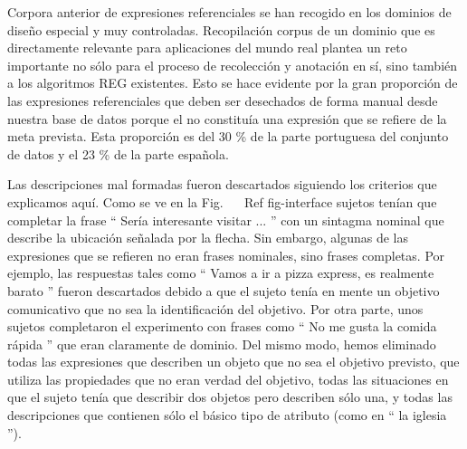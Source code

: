 Corpora anterior de expresiones referenciales se han recogido en los dominios de dise\~no especial y muy controladas. Recopilaci\'on corpus de un dominio que es directamente relevante para aplicaciones del mundo real plantea un reto importante no s\'olo para el proceso de recolecci\'on y anotaci\'on en s\'{i}, sino tambi\'en a los algoritmos REG existentes. Esto se hace evidente por la gran proporci\'on de las expresiones referenciales que deben ser desechados de forma manual desde nuestra base de datos porque el no constitu\'{i}a una expresi\'on que se refiere de la meta prevista. Esta proporci\'on es del 30 \% de la parte portuguesa del conjunto de datos y el 23 \% de la parte espa\~nola.

Las descripciones mal formadas fueron descartados siguiendo los criterios que explicamos aqu\'{i}. Como se ve en la Fig. ~ \ Ref {fig-interface} sujetos ten\'{i}an que completar la frase `` Ser\'{i}a interesante visitar ... '' con un sintagma nominal que describe la ubicaci\'on se\~nalada por la flecha. Sin embargo, algunas de las expresiones que se refieren no eran frases nominales, sino frases completas. Por ejemplo, las respuestas tales como `` Vamos a ir a pizza express, es realmente barato '' fueron descartados debido a que el sujeto ten\'{i}a en mente un objetivo comunicativo que no sea la identificaci\'on del objetivo. Por otra parte, unos sujetos completaron el experimento con frases como `` No me gusta la comida r\'apida '' que eran claramente de dominio. Del mismo modo, hemos eliminado todas las expresiones que describen un objeto que no sea el objetivo previsto, que utiliza las propiedades que no eran verdad del objetivo, todas las situaciones en que el sujeto ten\'{i}a que describir dos objetos pero describen s\'olo una, y todas las descripciones que contienen s\'olo el b\'asico tipo de atributo (como en `` la iglesia '').


